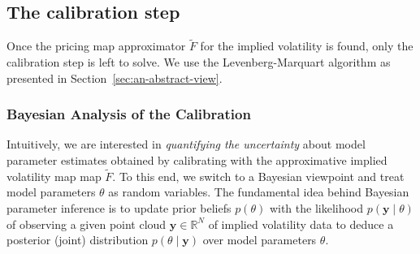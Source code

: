 \documentclass{article}
\theoremstyle{remark}
\begin{document}
\subsection{The calibration step}
\label{sec:calibrationStep}

Once the pricing map approximator $\widetilde{F}$  for the implied volatility
is found, only the calibration step is left to solve. We use the
Levenberg-Marquart algorithm as presented in Section~\ref{sec:an-abstract-view}.



\subsubsection{Bayesian Analysis of the Calibration}
\label{sec:bayes-analys-calibr}



Intuitively, we are interested in \emph{quantifying the uncertainty} about
model parameter estimates obtained by calibrating with the approximative
implied volatility map map $\widetilde{F}$. To this end, we switch to a
Bayesian viewpoint and treat model parameters $\theta$ as random
variables. The fundamental idea behind Bayesian parameter inference is to
update prior beliefs $p(\theta)$ with the likelihood $p(\bm{y} \mid \theta)$
of observing a given point cloud $\bm{y}\in \mathbb{R}^N$ of implied
volatility data to deduce a posterior (joint) distribution
$p(\theta \mid \bm{y})$ over model parameters $\theta$.
\end{document}
